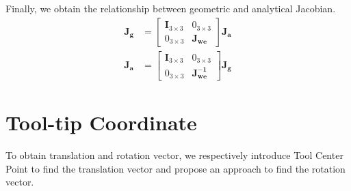 Finally, we obtain the relationship between geometric and analytical Jacobian.
\begin{equation}
\begin{split}
\mathbf{J_g} &= 
\begin{bmatrix}
\mathbf{I}_{3\times 3} & 0_{3\times 3}\\
0_{3\times 3} & \mathbf{J_{we}}
\end{bmatrix}
\mathbf{J_a}
\\
\mathbf{J_a} &= 
\begin{bmatrix}
\mathbf{I}_{3\times 3} & 0_{3\times 3}\\
0_{3\times 3} & \mathbf{J_{we}^{-1}}
\end{bmatrix}
\mathbf{J_g}
\end{split}
\end{equation}

\section{Tool-tip Coordinate}
\label{sec:ref_robot}
\hspace*{6mm}To obtain translation and rotation vector, we respectively introduce Tool Center Point to find the translation vector and propose an approach to find the rotation vector.				

